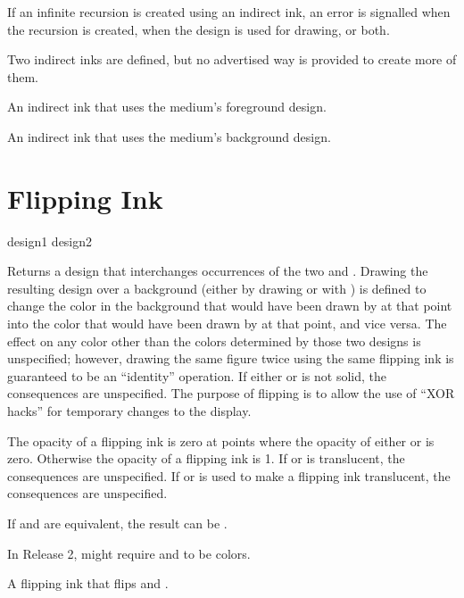 If an infinite recursion is created using an indirect ink, an error is
signalled when the recursion is created, when the design is used for drawing,
or both.

Two indirect inks are defined, but no advertised way is provided to create more
of them.


An indirect ink that uses the medium's foreground design.


An indirect ink that uses the medium's background design.


\section {Flipping Ink}

 {design1 design2}

Returns a design that interchanges occurrences of the two 
 and .  Drawing the resulting design over a background
(either by drawing or with ) is defined to change the color in
the background that would have been drawn by  at that point into
the color that would have been drawn by  at that point, and vice
versa.  The effect on any color other than the colors determined by those two
designs is unspecified; however, drawing the same figure twice using the same
flipping ink is guaranteed to be an ``identity'' operation.  If either
 or  is not solid, the consequences are unspecified.
The purpose of flipping is to allow the use of ``XOR hacks'' for temporary
changes to the display.

The opacity of a flipping ink is zero at points where the opacity of either
 or  is zero.  Otherwise the opacity of a flipping ink
is 1.  If  or  is translucent, the consequences are
unspecified.  If  or  is used to make a flipping
ink translucent, the consequences are unspecified.

If  and  are equivalent, the result can be
.

In Release 2,  might require  and
 to be colors.



A flipping ink that flips  and .


